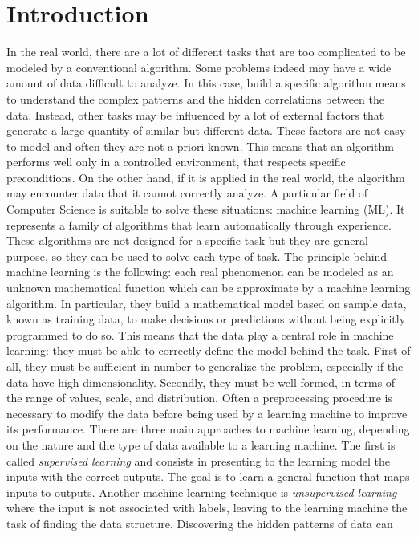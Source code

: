 \section{Introduction}
In the real world, there are a lot of different tasks that are too
complicated to be modeled by a conventional algorithm. Some problems
indeed may have a wide amount of data difficult to analyze. In this
case, build a specific algorithm means to understand the complex
patterns and the hidden correlations between the data. Instead, other
tasks may be influenced by a lot of external factors that generate a
large quantity of similar but different data. These factors are not easy
to model and often they are not a
priori known. This means that an algorithm performs well only in a
controlled environment, that respects specific preconditions. On the
other hand, if it is applied in the real world, the algorithm may
encounter data that it cannot correctly analyze. A particular field of
Computer Science is suitable to solve these situations:
machine learning (ML). It represents a family of algorithms that learn
automatically through experience. These algorithms are not designed for
a specific task but they are general purpose, so they can be used to
solve each type of task. The principle behind machine learning is the
following: each real phenomenon can be modeled as an unknown
mathematical function which can be approximate by a machine learning
algorithm. In particular, they build a mathematical model based on
sample data, known as training data, to make decisions or predictions
without being explicitly programmed to do so. This means that the data
play a central role in machine learning: they must be able to correctly
define the model behind the task. First of all, they must be sufficient
in number to generalize the problem, especially if the data have high
dimensionality. Secondly, they must be well-formed, in terms of the
range of values, scale, and distribution. Often a preprocessing
procedure is necessary to modify the data before being used by a
learning machine to improve its performance. There are three main
approaches to machine learning, depending on the nature and the type of
data available to a learning machine. The first is called
\emph{supervised learning} and consists in presenting to the learning
model the inputs with the correct outputs. The goal is to learn a
general function that maps inputs to outputs. Another machine learning
technique is \emph{unsupervised learning} where the input is not
associated with labels, leaving to the learning machine the task of
finding the data structure. Discovering the hidden patterns of data can
